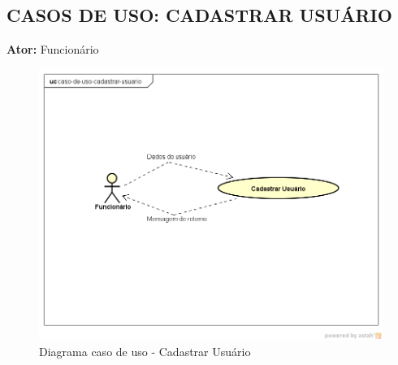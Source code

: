 \subsection{CASOS DE USO: CADASTRAR USUÁRIO}
\begin{flushleft}
\textbf{Ator:}  Funcionário
\end{flushleft}

\begin{figure}[htb]
	\caption{\label{fig_login} Diagrama caso de uso - Cadastrar Usuário}
	\begin{center}
	    \includegraphics[width=0.7\linewidth]{imagens/cadastrar-usuario.png}
	\end{center}
\end{figure}

\newpage

